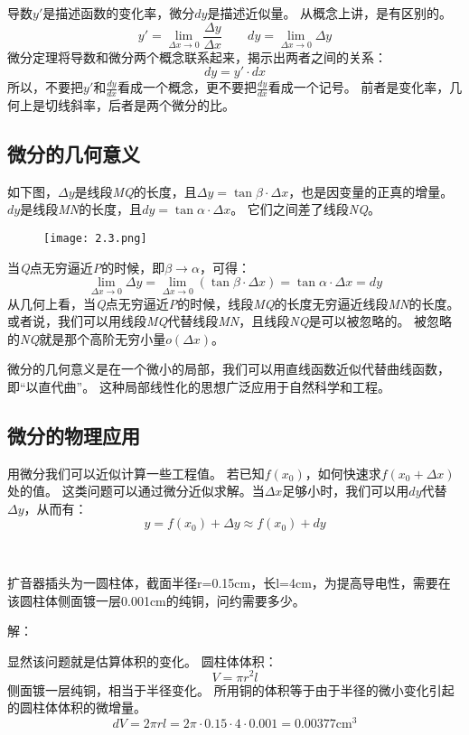 导数$y'$是描述函数的变化率，微分$dy$是描述近似量。
从概念上讲，是有区别的。
\[
y'=\underset{\Delta x\rightarrow 0}{\lim}\frac{\Delta y}{\Delta x} \qquad dy=\underset{\Delta x\rightarrow 0}{\lim}\Delta y
\]
微分定理将导数和微分两个概念联系起来，揭示出两者之间的关系：
\[
dy=y'\cdot dx
\]
所以，不要把$y'$和$\frac{dy}{dx}$看成一个概念，更不要把$\frac{dy}{dx}$看成一个记号。
前者是变化率，几何上是切线斜率，后者是两个微分的比。

\subsection{微分的几何意义}

如下图，$\Delta y$是线段{\it MQ}的长度，且$\Delta y=\tan \beta \cdot \Delta x$，也是因变量的正真的增量。
$dy$是线段{\it MN}的长度，且$dy=\tan \alpha \cdot \Delta x$。
它们之间差了线段{\it NQ}。

\begin{figure}[h]
\centering
\texttt{[image: 2.3.png]}
\end{figure}

当{\it Q}点无穷逼近{\it P}的时候，即$\beta \rightarrow \alpha $，可得：
\[
\underset{\Delta x\rightarrow 0}{\lim}\Delta y=\underset{\Delta x\rightarrow 0}{\lim}\left( \tan \beta \cdot \Delta x \right) =\tan \alpha \cdot \Delta x=dy
\]
从几何上看，当{\it Q}点无穷逼近{\it P}的时候，线段{\it MQ}的长度无穷逼近线段{\it MN}的长度。
或者说，我们可以用线段{\it MQ}代替线段{\it MN}，且线段{\it NQ}是可以被忽略的。
被忽略的{\it NQ}就是那个高阶无穷小量$o\left( \Delta x \right) $。

微分的几何意义是在一个微小的局部，我们可以用直线函数近似代替曲线函数，即“以直代曲”。
这种局部线性化的思想广泛应用于自然科学和工程。

\subsection{微分的物理应用}

用微分我们可以近似计算一些工程值。
若已知$f\left( x_0 \right) $，如何快速求$f\left( x_0+\Delta x \right) $处的值。
这类问题可以通过微分近似求解。当$\Delta x$足够小时，我们可以用$dy$代替$\Delta y$，从而有：
\[
y=f\left( x_0 \right) +\Delta y\approx f\left( x_0 \right) +dy
\]

~

\begin{example}
扩音器插头为一圆柱体，截面半径r=0.15cm，长l=4cm，为提高导电性，需要在该圆柱体侧面镀一层0.001cm的纯铜，问约需要多少。
\end{example}

解：

显然该问题就是估算体积的变化。
圆柱体体积：
\[
V=\pi r^2l
\]
侧面镀一层纯铜，相当于半径变化。
所用铜的体积等于由于半径的微小变化引起的圆柱体体积的微增量。
\[
dV=2\pi rl=2\pi \cdot 0.15\cdot 4\cdot 0.001=0.00377\mathrm{cm}^3
\]




